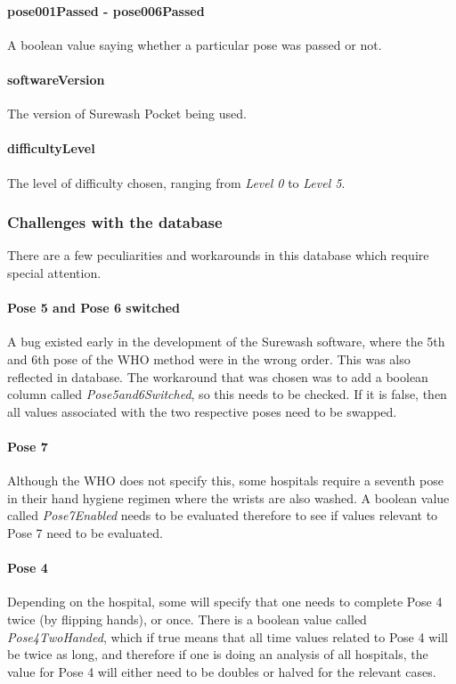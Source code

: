             \paragraph{pose001Passed - pose006Passed} A boolean value saying whether a particular pose was passed or not.
            \paragraph{softwareVersion} The version of Surewash Pocket being used.
            \paragraph{difficultyLevel} The level of difficulty chosen, ranging from {\slshape Level 0} to {\slshape Level 5}.
        \subsubsection{Challenges with the database} There are a few peculiarities and workarounds in this database which require special attention.
            \paragraph{Pose 5 and Pose 6 switched} A bug existed early in the development of the Surewash software, where the 5th and 6th pose of the WHO method were in the wrong order. This was also reflected in database. The workaround that was chosen was to add a boolean column called {\slshape Pose5and6Switched}, so this needs to be checked. If it is false, then all values associated with the two respective poses need to be swapped.
            \paragraph{Pose 7} Although the WHO does not specify this, some hospitals require a seventh pose in their hand hygiene regimen where the wrists are also washed. A boolean value called {\slshape Pose7Enabled} needs to be evaluated therefore to see if values relevant to Pose 7 need to be evaluated.
            \paragraph{Pose 4} Depending on the hospital, some will specify that one needs to complete Pose 4 twice (by flipping hands), or once. There is a boolean value called {\slshape Pose4TwoHanded}, which if true means that all time values related to Pose 4 will be twice as long, and therefore if one is doing an analysis of all hospitals, the value for Pose 4 will either need to be doubles or halved for the relevant cases.

